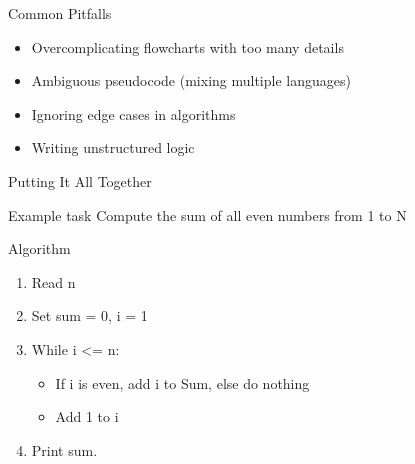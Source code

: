 \documentclass[12pt, aspectratio=169]{beamer}
\begin{document}
    \begin{frame}{Common Pitfalls}
    \begin{itemize}
        \item Overcomplicating flowcharts with too many details
        \item Ambiguous pseudocode (mixing multiple languages)
        \item Ignoring edge cases in algorithms
        \item Writing unstructured logic
    \end{itemize}
    \end{frame}
    

    \begin{frame}{Putting It All Together}
    \begin{block}{Example task}
    Compute the sum of all even numbers from 1 to N
    \end{block}
    \end{frame}


    \begin{frame}{Algorithm}
    \begin{enumerate}
        \item Read n
        \item Set sum = 0, i = 1
        \item While i <= n:
            \begin{itemize}
                \item If i is even, add i to Sum, else do nothing
                \item Add 1 to i
            \end{itemize}
        \item Print sum.
    \end{enumerate}
    \end{frame}
\end{document}
